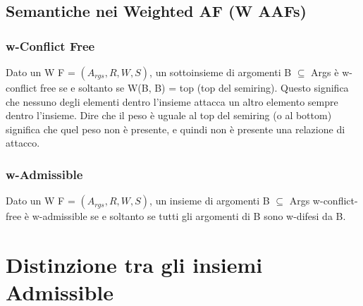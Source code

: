 \subsection{Semantiche nei Weighted AF (W AAFs)}
\subsubsection{w-Conflict Free}
Dato un W F = $(A_{rgs} , R, W, S)$, un sottoinsieme di argomenti B $\subseteq$ Args è w-conflict free se e soltanto se W(B, B) = top (top del semiring). Questo significa che nessuno degli elementi dentro l’insieme attacca un altro elemento sempre dentro l’insieme. Dire che il peso è uguale al top del semiring (o al bottom) significa che quel peso non è presente, e quindi non è presente una relazione di attacco.
\subsubsection{w-Admissible}
Dato un W F = $(A_{rgs} , R, W, S)$, un insieme di argomenti B $\subseteq$ Args w-conflict-free è w-admissible se e soltanto se tutti gli argomenti di B sono w-difesi da B.
\section{Distinzione tra gli insiemi Admissible}
